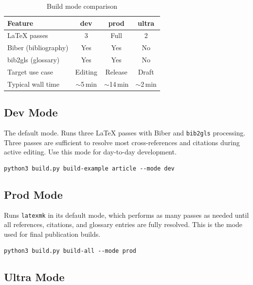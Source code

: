 \begin{table}[htbp]
    \centering
    \caption{Build mode comparison}
    \label{tab:build-modes}
    \begin{tabular}{@{} l c c c @{}}
        \toprule
        \textbf{Feature} & \textbf{dev} & \textbf{prod} & \textbf{ultra} \\
        \midrule
        \LaTeX{} passes        & 3        & Full     & 2        \\
        Biber (bibliography)   & Yes      & Yes      & No       \\
        bib2gls (glossary)     & Yes      & Yes      & No       \\
        Target use case        & Editing  & Release  & Draft    \\
        Typical wall time      & $\sim$5\,min  & $\sim$14\,min & $\sim$2\,min \\
        \bottomrule
    \end{tabular}
\end{table}

\subsection{Dev Mode}

The default mode.  Runs three \LaTeX{} passes with Biber and \texttt{bib2gls}
processing.  Three passes are sufficient to resolve most cross-references and
citations during active editing.  Use this mode for day-to-day development.

\begin{verbatim}
python3 build.py build-example article --mode dev
\end{verbatim}

\subsection{Prod Mode}

Runs \texttt{latexmk} in its default mode, which performs as many passes as
needed until all references, citations, and glossary entries are fully resolved.
This is the mode used for final publication builds.

\begin{verbatim}
python3 build.py build-all --mode prod
\end{verbatim}

\subsection{Ultra Mode}

